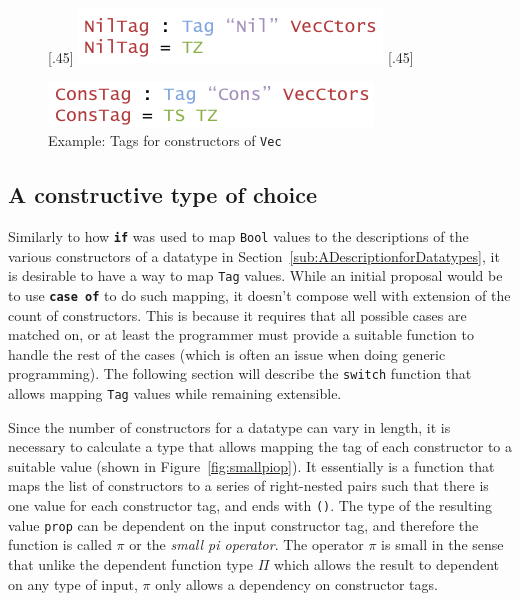\documentclass{ituthesis}
\newcommand{\ttconstructor}[1]{\textcolor{constructor-color}{\texttt{#1}}}
\newcommand{\tttype}[1]{\textcolor{type-color}{\texttt{#1}}}
\newcommand{\ttdec}[1]{\textcolor{declared-var-color}{\texttt{#1}}}
\newcommand{\ttvar}[1]{\textcolor{local-var-color}{\texttt{#1}}}
\theoremstyle{definition}
\begin{document}
\begin{figure}[ht]
\begin{center}
  \subcaptionbox{Tag for \ttconstructor{Nil}\label{fig:vecctornil}}[.45\textwidth]{
    \includegraphics[scale=0.5]{Figures/VectorNilTag.png}
}
\subcaptionbox{Tag for \ttconstructor{Cons}\label{fig:vecctorcons}}[.45\textwidth]{
    \includegraphics[scale=0.5]{Figures/VectorConsTag.png}

}
\caption{Example: Tags for constructors of \tttype{Vec}}
\label{fig:vecctor}
\end{center}
\end{figure}


\subsection{A constructive type of choice}
\label{sub:AConstructiveTypeofChoice}
Similarly to how \texttt{\textbf{if}} was used to map \tttype{Bool} values to the descriptions of the various constructors of a datatype in Section~\ref{sub:ADescriptionforDatatypes}, it is desirable to have a way
to map \tttype{Tag} values. While an initial proposal would be to use \texttt{\textbf{case of}} to do such mapping, it doesn't compose well with extension of the count of constructors.
This is because it requires that all possible cases are matched on, or at least the programmer must provide a suitable function to handle the rest of the cases (which is often an issue when doing generic programming).
The following section will describe the \ttdec{switch} function that allows mapping \tttype{Tag} values while remaining extensible.

Since the number of constructors for a datatype can vary in length, it is necessary to calculate a type that allows mapping the tag of each constructor to a suitable value (shown in Figure~\ref{fig:smallpiop}). 
It essentially is a function that maps the list of constructors to a series of right-nested pairs such that there is one value for each constructor tag, and ends with \tttype{()}.
The type of the resulting value \ttvar{prop} can be dependent on the input constructor tag, and therefore the function is called $\pi$ or the \textit{small pi operator}.
The operator $\pi$ is small in the sense that unlike the dependent function type $\Pi$ which allows the result to dependent on any type of input, $\pi$ only allows a dependency on constructor tags.
\end{document}
